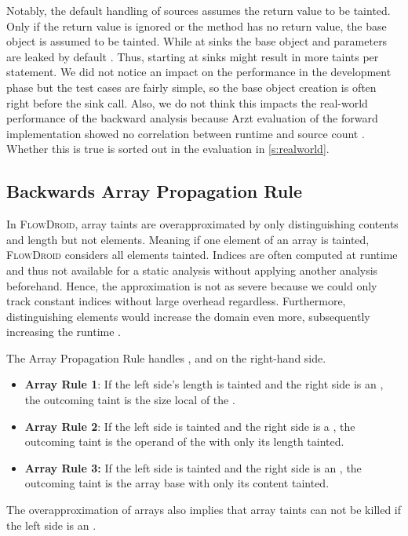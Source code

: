 \documentclass[../draft.tex]{subfiles}
\begin{document}
    Notably, the default handling of sources assumes the return value to be tainted. 
    Only if the return value is ignored or the method has no return value, the base object is assumed to be tainted.
    While at sinks the base object and parameters are leaked by default \cite{Arzt2017PhD}.
    Thus, starting at sinks might result in more taints per statement.
    We did not notice an impact on the performance in the development phase but the test cases are fairly simple, so the base object creation is often right before the sink call.
    Also, we do not think this impacts the real-world performance of the backward analysis because Arzt evaluation of the forward implementation showed no correlation between runtime and source count \cite{Arzt2017PhD}.
    Whether this is true is sorted out in the evaluation in \autoref{s:realworld}.

    \subsection{Backwards Array Propagation Rule}
    In \textsc{FlowDroid}, array taints are overapproximated by only distinguishing contents and length but not elements. Meaning if one element of an array is tainted, \textsc{FlowDroid} considers all elements tainted. 
    Indices are often computed at runtime and thus not available for a static analysis without applying another analysis beforehand. Hence, the approximation is not as severe because we could only track constant indices without large overhead regardless. 
    Furthermore, distinguishing elements would increase the domain even more, subsequently increasing the runtime \cite{Arzt2017PhD}.

    The Array Propagation Rule handles ,  and  on the right-hand side.
    \begin{itemize}
        \item \textbf{Array Rule 1}: If the left side's length is tainted and the right side is an , the outcoming taint is the size local of the .
        \item  \textbf{Array Rule 2}: If the left side is tainted and the right side is a , the outcoming taint is the operand of the  with only its length tainted.
        \item \textbf{Array Rule 3:} If the left side is tainted and the right side is an , the outcoming taint is the array base with only its content tainted.
    \end{itemize}
    The overapproximation of arrays also implies that array taints can not be killed if the left side is an .
\end{document}
